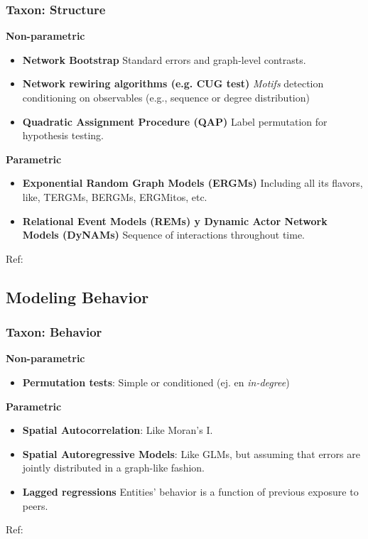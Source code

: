 \documentclass[aspectratio=169,10pt]{beamer}
\begin{document}
\begin{frame}
	\frametitle{Taxon: Structure}
\pause
	\textbf{Non-parametric}
	\begin{itemize}
		\item \textbf{Network Bootstrap} Standard errors and graph-level contrasts.
		\item \textbf{Network rewiring algorithms (e.g. CUG test)} \textit{Motifs} detection conditioning on observables (e.g., sequence or degree distribution)
		\item \textbf{Quadratic Assignment Procedure (QAP)} Label permutation for hypothesis testing.
	\end{itemize}\pause	
	
	\textbf{Parametric}

	\begin{itemize}
		\item \textbf{Exponential Random Graph Models (ERGMs)} Including all its flavors, like, TERGMs, BERGMs, ERGMitos, etc.
		\item \textbf{Relational Event Models (REMs) y Dynamic Actor Network Models (DyNAMs)} Sequence of interactions throughout time.
	\end{itemize}

Ref: \textcite{Snijders1999,Butts2008b,Krackhardt1988,Robins2007,VegaYon2021,Caimo2014,Butts2008,Stadtfeld2017}
	
\end{frame}

\subsection{Modeling Behavior}

\begin{frame}
	\frametitle{Taxon: Behavior}
\pause	
	\textbf{Non-parametric}
	\begin{itemize}
		\item \textbf{Permutation tests}: Simple or conditioned (ej. en \textit{in-degree})
	\end{itemize}
\pause
	\textbf{Parametric}
	\begin{itemize}
		\item \textbf{Spatial Autocorrelation}: Like Moran's I.
		\item \textbf{Spatial Autoregressive Models}: Like GLMs, but assuming that errors are jointly distributed in a graph-like fashion.
		\item \textbf{Lagged regressions} Entities' behavior is a function of previous exposure to peers.
	\end{itemize}

Ref: \textcite{Butts2008b,Moran1950,LeSage2008,Valente2019}

\end{frame}
\end{document}

